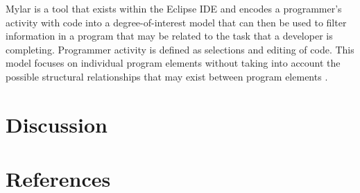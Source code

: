 \documentclass[12pt]{article}
\begin{document}
Mylar is a tool that exists within the Eclipse IDE and encodes a programmer's activity with code into a degree-of-interest model that can then be used to filter information in a program that may be related to the task that a developer is completing. Programmer activity is defined as selections and editing of code. This model focuses on individual program elements without taking into account the possible structural relationships that may exist between program elements \cite{KerstenEtAl2005}.




\clearpage

\section{Discussion}



\clearpage


\section{References}

\printbibliography
\end{document}
